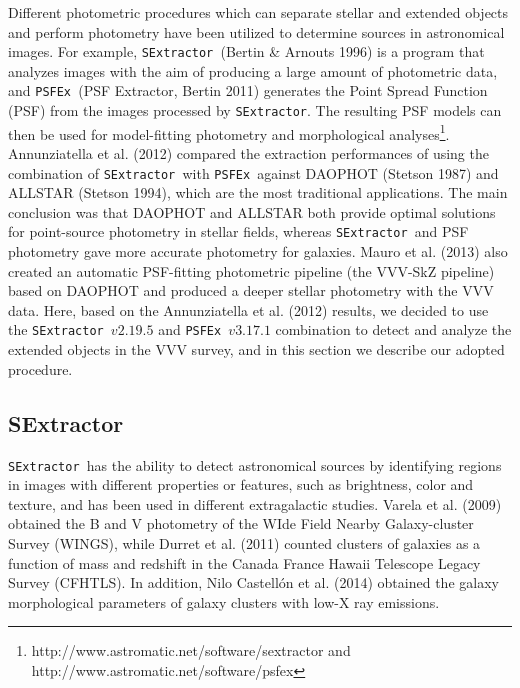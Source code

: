 \documentclass[preprint2]{aastex}
\newcommand{\se}{{\tt SExtractor\ }}
\newcommand{\psf}{{\tt PSFEx\ }}
\begin{document}
Different photometric procedures which can separate stellar and extended
objects and perform photometry have been utilized to determine sources
in astronomical images. For example, \se (Bertin \& Arnouts 1996) is a program
that analyzes
 images with the aim of producing a 
large 
amount of photometric data, and \psf (PSF Extractor, Bertin 2011) 
generates the Point Spread Function (PSF)
from the images processed by {\tt SExtractor}. The resulting PSF models can
then be used for model-fitting
photometry and morphological analyses\footnote{http://www.astromatic.net/software/sextractor and http://www.astromatic.net/software/psfex}. 
Annunziatella et al. (2012) compared the extraction performances
of using the combination of \se  with \psf against DAOPHOT (Stetson 1987) and 
ALLSTAR (Stetson 1994), which are the most traditional applications. The main
conclusion was 
that DAOPHOT and ALLSTAR both provide optimal solutions for point-source 
photometry in stellar fields, whereas \se and PSF photometry gave more 
accurate photometry for galaxies. 
Mauro et al. (2013) also created an automatic PSF-fitting 
photometric pipeline (the VVV-SkZ pipeline) based on DAOPHOT and 
produced a deeper stellar photometry with the VVV data.  
Here, based on the Annunziatella et al. (2012)  results, we decided to use the 
\se $v2.19.5$ and \psf $v3.17.1$ combination to detect and analyze the 
extended objects in the VVV survey, and in this section we describe our adopted procedure.

\subsection{\bf{SExtractor}}

\se has the ability to detect astronomical sources by identifying regions in images with 
different properties or features, such as brightness, color and texture, and
has been used  in different extragalactic 
studies.  Varela et al. (2009) obtained the B and V photometry of 
the WIde Field Nearby Galaxy-cluster Survey (WINGS), while Durret et al. 
(2011) counted clusters of galaxies as a function of mass and redshift 
in the Canada France Hawaii Telescope Legacy Survey (CFHTLS).
 In addition, Nilo Castell\'on et al. (2014) obtained the galaxy morphological 
parameters of galaxy clusters with low-X ray emissions.  
\end{document}
